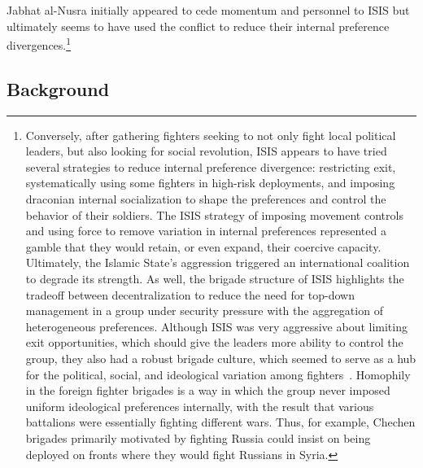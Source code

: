 Jabhat al-Nusra initially appeared to cede momentum and personnel to ISIS but ultimately seems to have used the conflict to reduce their internal preference divergences.\footnote{Conversely, after gathering fighters seeking to not only fight local political leaders, but also looking for social revolution, ISIS appears to have tried several strategies to reduce internal preference divergence: restricting exit, systematically using some fighters in high-risk deployments, and imposing draconian internal socialization to shape the preferences and control the behavior of their soldiers. The ISIS strategy of imposing movement controls and using force to remove variation in internal preferences represented a gamble that they would retain, or even expand, their coercive capacity. Ultimately, the Islamic State's aggression triggered an international coalition to degrade its strength. As well, the brigade structure of ISIS highlights the tradeoff between decentralization to reduce the need for top-down management in a group under security pressure with the aggregation of heterogeneous preferences.  Although ISIS was very aggressive about limiting exit opportunities, which should give the leaders more ability to control the group, they also had a robust brigade culture, which seemed to serve as a hub for the political, social, and ideological variation among fighters~\autocite{mironova2019freedom, weiss2015isis, weiss2016isis}. Homophily in the foreign fighter brigades is a way in which the group never imposed uniform ideological preferences internally, with the result that various battalions were essentially fighting different wars. Thus, for example, Chechen brigades primarily motivated by fighting Russia could insist on being deployed on fronts where they would fight Russians in Syria.}

\subsection{Background}

